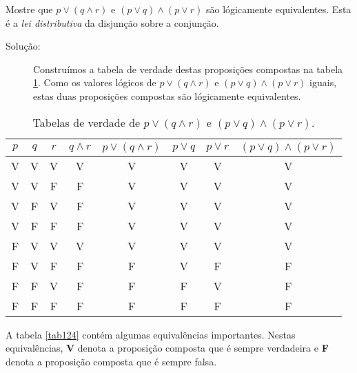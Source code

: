 \label{exem123}
\begin{exmp}
Mostre que $p \lor (q \land r)$ e $(p \lor q) \land (p \lor r)$ são lógicamente
equivalentes. Esta é a \emph{lei distributiva} da disjunção sobre a conjunção.
\end{exmp}

\begin{description}
\item[Solução:] Construímos a tabela de verdade destas proposições compostas na
tabela \ref{tab123}. Como os valores lógicos de $p \lor (q \land r)$ e $(p
\lor q) \land (p \lor r)$ iguais, estas duas proposições compostas são
lógicamente equivalentes.
\end{description}

\begin{table}[H]
	\centering
	\begin{tabular}{|c|c|c|c|c|c|c|c|}%
	\toprule
	\textbf{$p$} & \textbf{$q$} & \textbf{$r$} & \textbf{$q \land r$} &
	\textbf{$p \lor (q \land r)$} & \textbf{$p \lor q$} & \textbf{$p \lor r$} &
	\textbf{$(p \lor q) \land (p \lor r)$}\\
	\midrule
	V & V & V & V & V & V & V & V\\
	V & V & F & F & V & V & V & V\\
	V & F & V & F & V & V & V & V\\
	V & F & F & F & V & V & V & V\\
	F & V & V & V & V & V & V & V\\
	F & V & F & F & F & V & F & F\\
	F & F & V & F & F & F & V & F\\
	F & F & F & F & F & F & F & F\\
	\bottomrule%
	\end{tabular}%
	\caption{Tabelas de verdade de $p \lor (q \land r)$ e $(p \lor q) \land (p \lor
	r)$.}
	\label{tab123}
\end{table}
A tabela \ref{tab124} contém algumas equivalências importantes. Nestas
equivalências, \textbf{V} denota a proposição composta que é sempre verdadeira e
\textbf{F} denota a proposição composta que é sempre falsa.

